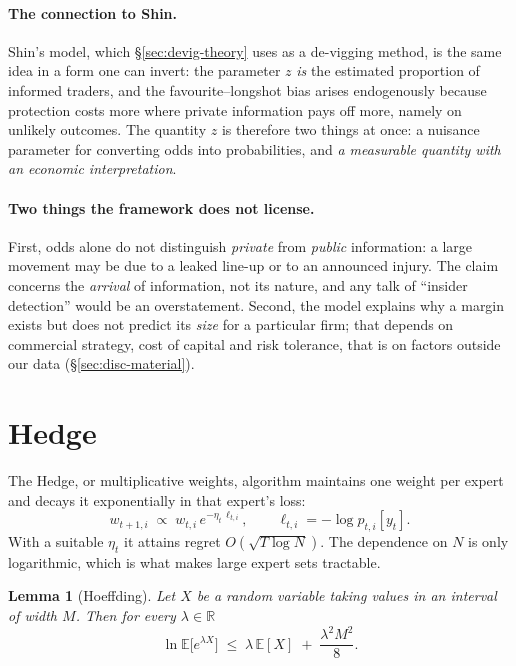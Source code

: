 \documentclass[12pt,a4paper,oneside]{report}
\renewcommand{\_}{\oldunderscore\allowbreak}
\theoremstyle{definition}
\theoremstyle{plain}
\newtheorem{lemma}[theorem]{Lemma}
\theoremstyle{remark}
\begin{document}
\paragraph{The connection to Shin.} Shin's model, which \S\ref{sec:devig-theory} uses as a
de-vigging method, is the same idea in a form one can invert: the parameter $z$ \emph{is} the
estimated proportion of informed traders, and the favourite--longshot bias arises endogenously
because protection costs more where private information pays off more, namely on unlikely
outcomes. The quantity $z$ is therefore two things at once: a nuisance parameter for converting
odds into probabilities, and \emph{a measurable quantity with an economic interpretation}.

\paragraph{Two things the framework does not license.} First, odds alone do not distinguish
\emph{private} from \emph{public} information: a large movement may be due to a leaked line-up
or to an announced injury. The claim concerns the \emph{arrival} of information, not its
nature, and any talk of ``insider detection'' would be an overstatement. Second, the model
explains why a margin exists but does not predict its \emph{size} for a particular firm; that
depends on commercial strategy, cost of capital and risk tolerance, that is on factors outside
our data (\S\ref{sec:disc-material}).

\section{Hedge}

The Hedge, or multiplicative weights, algorithm maintains one weight per expert and decays it
exponentially in that expert's loss:
\[
w_{t+1,i} \;\propto\; w_{t,i}\, e^{-\eta_t\, \ell_{t,i}},
\qquad \ell_{t,i} = -\log p_{t,i}[y_t].
\]
With a suitable $\eta_t$ it attains regret $O(\sqrt{T \log N})$. The dependence on $N$ is only
logarithmic, which is what makes large expert sets tractable.

\begin{lemma}[Hoeffding]
\label{lem:hoeffding}
Let $X$ be a random variable taking values in an interval of width $M$. Then for every
$\lambda\in\mathbb{R}$
\[
\ln \mathbb{E}\big[e^{\lambda X}\big] \;\leq\; \lambda\, \mathbb{E}[X] \;+\; \frac{\lambda^2 M^2}{8}.
\]
\end{lemma}
\end{document}
